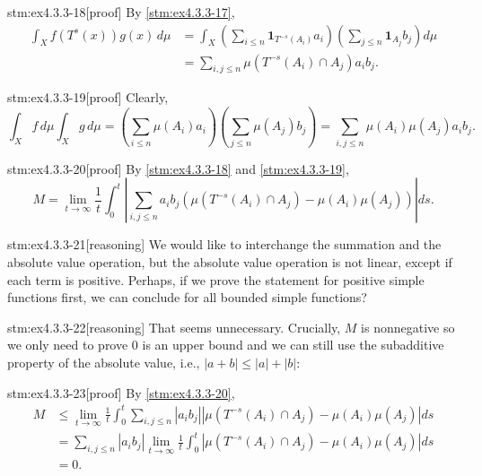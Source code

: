 \begin{stm}{stm:ex4.3.3-18}[proof]
By \ref{stm:ex4.3.3-17},
\begin{align*}
\int_X f(T^s(x))g(x) \, d\mu &= \int_X \left( \sum_{i \leq n} \mathbf{1}_{T^{-s}(A_i)} a_i \right) \left( \sum_{j \leq n} \mathbf{1}_{A_j} b_j \right) d\mu \\
&= \sum_{i,j \leq n} \mu(T^{-s}(A_i) \cap A_j) a_i b_j.
\end{align*}
\end{stm}

\begin{stm}{stm:ex4.3.3-19}[proof]
Clearly,
\[
\int_X f \, d\mu \int_X g \, d\mu = \left( \sum_{i \leq n} \mu(A_i) a_i \right) \left( \sum_{j \leq n} \mu(A_j) b_j \right) = \sum_{i,j \leq n} \mu(A_i)\mu(A_j) a_i b_j.
\]
\end{stm}

\begin{stm}{stm:ex4.3.3-20}[proof]
By \ref{stm:ex4.3.3-18} and \ref{stm:ex4.3.3-19},
\[
M= \lim_{t \to \infty} \frac{1}{t} \int_0^t \left| \sum_{i,j \leq n} a_i b_j \left( \mu(T^{-s}(A_i) \cap A_j) - \mu(A_i)\mu(A_j) \right) \right| ds.
\]
\end{stm}

\begin{stm}{stm:ex4.3.3-21}[reasoning]
We would like to interchange the summation and the absolute value operation, but the absolute value operation is not linear, except if each term is positive. Perhaps, if we prove the statement for positive simple functions first, we can conclude for all bounded simple functions?
\end{stm}

\begin{stm}{stm:ex4.3.3-22}[reasoning]
That seems unnecessary. Crucially, $M$ is nonnegative so we only need to prove $0$ is an upper bound and we can still use the subadditive property of the absolute value, i.e., $|a + b| \leq |a| + |b|$:
\end{stm}

\begin{stm}{stm:ex4.3.3-23}[proof]
By \ref{stm:ex4.3.3-20},
\begin{align*}
M&\leq \lim_{t \to \infty} \frac{1}{t} \int_0^t \sum_{i,j \leq n} |a_i b_j| \left| \mu(T^{-s}(A_i) \cap A_j) - \mu(A_i)\mu(A_j) \right| ds \\
&= \sum_{i,j \leq n} |a_i b_j| \lim_{t \to \infty} \frac{1}{t} \int_0^t \left| \mu(T^{-s}(A_i) \cap A_j) - \mu(A_i)\mu(A_j) \right| ds \\
&= 0.
\end{align*}
\end{stm}

